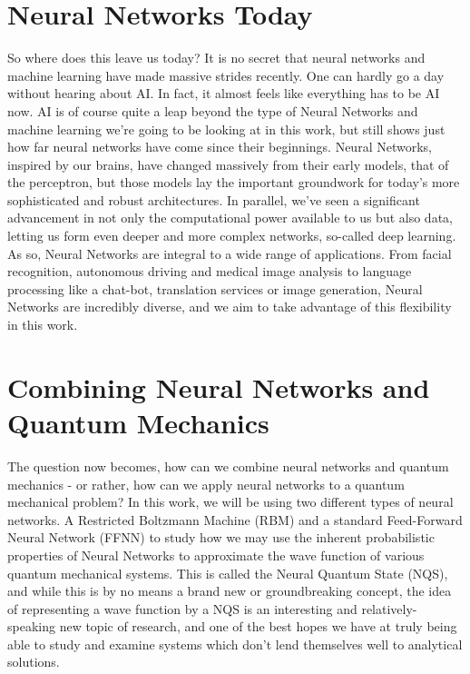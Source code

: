 \documentclass[12pt]{article}
\begin{document}
{\section{Neural Networks Today}
So where does this leave us today? It is no secret that neural networks and machine learning have made massive strides recently. One can hardly go a day without hearing about AI. In fact, it almost feels like everything has to be AI now. AI is of course quite a leap beyond the type of Neural Networks and machine learning we're going to be looking at in this work, but still shows just how far neural networks have come since their beginnings. \newline
Neural Networks, inspired by our brains, have changed massively from their early models, that of the perceptron, but those models lay the important groundwork for today's more sophisticated and robust architectures. In parallel, we've seen a significant advancement in not only the computational power available to us but also data, letting us form even deeper and more complex networks, so-called deep learning.
\newline
As so, Neural Networks are integral to a wide range of applications. From facial recognition, autonomous driving and medical image analysis to language processing like a chat-bot, translation services or image generation, Neural Networks are incredibly diverse, and we aim to take advantage of this flexibility in this work.
\section{Combining Neural Networks and Quantum Mechanics}
The question now becomes, how can we combine neural networks and quantum mechanics - or rather, how can we apply neural networks to a quantum mechanical problem? \newline
In this work, we will be using two different types of neural networks. A Restricted Boltzmann Machine (RBM) and a standard Feed-Forward Neural Network (FFNN) to study how we may use the inherent probabilistic properties of Neural Networks to approximate the wave function of various quantum mechanical systems. \newline This is called the Neural Quantum State (NQS), and while this is by no means a brand new or groundbreaking concept, the idea of representing a wave function by a NQS is an interesting and relatively-speaking new topic of research, and one of the best hopes we have at truly being able to study and examine systems which don't lend themselves well to analytical solutions.
}
\end{document}

